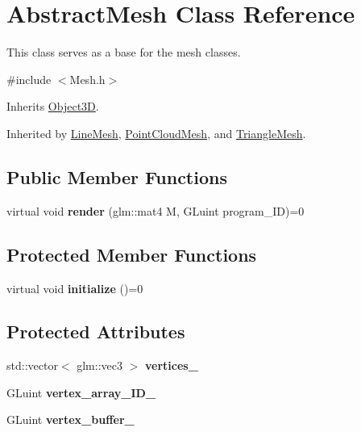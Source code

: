 \hypertarget{class_abstract_mesh}{\section{Abstract\-Mesh Class Reference}
\label{class_abstract_mesh}
}


This class serves as a base for the mesh classes.  




{\ttfamily \#include $<$Mesh.\-h$>$}



Inherits \hyperlink{class_object3_d}{Object3\-D}.



Inherited by \hyperlink{class_line_mesh}{Line\-Mesh}, \hyperlink{class_point_cloud_mesh}{Point\-Cloud\-Mesh}, and \hyperlink{class_triangle_mesh}{Triangle\-Mesh}.

\subsection*{Public Member Functions}
\begin{DoxyCompactItemize}
\item 
\hypertarget{class_abstract_mesh_ae0b36207700aa71d2f70c08fe7697d4b}{virtual void {\bfseries render} (glm\-::mat4 M, G\-Luint program\-\_\-\-I\-D)=0}\label{class_abstract_mesh_ae0b36207700aa71d2f70c08fe7697d4b}

\end{DoxyCompactItemize}
\subsection*{Protected Member Functions}
\begin{DoxyCompactItemize}
\item 
\hypertarget{class_abstract_mesh_ad54d1b7fe778368ffc99df2d52f5d235}{virtual void {\bfseries initialize} ()=0}\label{class_abstract_mesh_ad54d1b7fe778368ffc99df2d52f5d235}

\end{DoxyCompactItemize}
\subsection*{Protected Attributes}
\begin{DoxyCompactItemize}
\item 
\hypertarget{class_abstract_mesh_a58fd0465001bc734468e5ea09b6f89c9}{std\-::vector$<$ glm\-::vec3 $>$ {\bfseries vertices\-\_\-}}\label{class_abstract_mesh_a58fd0465001bc734468e5ea09b6f89c9}

\item 
\hypertarget{class_abstract_mesh_ad6e0a59ec0efe80fec3f2eac2260350b}{G\-Luint {\bfseries vertex\-\_\-array\-\_\-\-I\-D\-\_\-}}\label{class_abstract_mesh_ad6e0a59ec0efe80fec3f2eac2260350b}

\item 
\hypertarget{class_abstract_mesh_a251da8d545fef7d87249fbb4adc6ffe3}{G\-Luint {\bfseries vertex\-\_\-buffer\-\_\-}}\label{class_abstract_mesh_a251da8d545fef7d87249fbb4adc6ffe3}

\end{DoxyCompactItemize}
